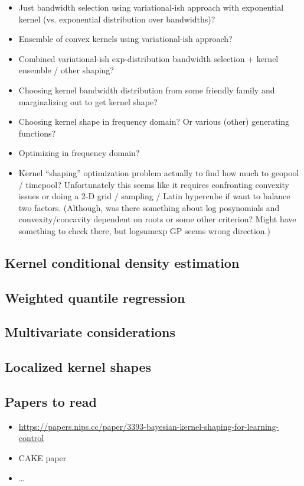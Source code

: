 \documentclass{article}
\begin{document}
\begin{itemize}
\item

  Just bandwidth selection using variational-ish approach with exponential
  kernel (vs. exponential distribution over bandwidths)?

\item

  Ensemble of convex kernels using variational-ish approach?

\item

  Combined variational-ish exp-distribution bandwidth selection + kernel
  ensemble / other shaping?

\item

  Choosing kernel bandwidth distribution from some friendly family and
  marginalizing out to get kernel shape?

\item

  Choosing kernel shape in frequency domain? Or various (other) generating functions?

\item

  Optimizing in frequency domain?

\item

  Kernel ``shaping'' optimization problem actually to find how much to geopool /
  timepool? Unfortunately this seems like it requires confronting convexity
  issues or doing a 2-D grid / sampling / Latin hypercube if want to balance two
  factors.  (Although, was there something about log posynomials and
  convexity/concavity dependent on roots or some other criterion?  Might have
  something to check there, but logsumexp GP seems wrong direction.)

\end{itemize}

\subsection{Kernel conditional density estimation}

\subsection{Weighted quantile regression}

\subsection{Multivariate considerations}

\subsection{Localized kernel shapes}

\subsection{Papers to read}
\begin{itemize}
\item \url{https://papers.nips.cc/paper/3393-bayesian-kernel-shaping-for-learning-control}
\item CAKE paper
\item \ldots
\end{itemize}
\end{document}

